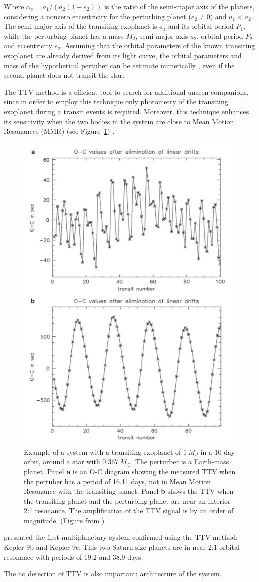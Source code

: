 Where $\alpha_e = a_1/(a_2(1-e_2))$ is the ratio of the semi-major axis of the planets, considering a nonzero eccentricity for the perturbing planet ($e_2 \neq 0$) and $a_1 < a_2$. The semi-major axis of the transiting exoplanet is $a_1$ and its orbital period $P_1$, while the perturbing planet has a mass $M_2$, semi-major axis $a_2$, orbital period $P_2$ and eccentricity $e_2$. Assuming that the orbital parameters of the known transiting exoplanet are already derived from its light curve, the orbital parameters and mass of the hypothetical pertuber can be estimate numerically \citep{Nesvorny2008,Nesvorny2009}, even if the second planet does not transit the star. 

The TTV method is a efficient tool to search for additional unseen companions, since in order to employ this technique only photometry of the transiting exoplanet during a transit events is required. Moreover, this technique enhances its sensitivity when the two bodies in the system are close to Mean Motion Resonances (MMR) \citep{Agol2005,Steffen2005,Agol2007} (see Figure~\ref{rms_ttv_amplitude}) . 

\begin{figure}
\centering
\includegraphics[width=0.6\columnwidth]{imagenes/rms_ttv_amplitude}
\caption{Example of a system with a transiting exoplanet of $1~M_{J}$ in a 10-day orbit, around a star with $0.367~M_{\odot}$. The perturber is a Earth-mass planet. Panel \textbf{a} is an O-C diagram showing the measured TTV when the pertuber has a period of 16.11 days, not in Mean Motion Resonance with the transiting planet. Panel \textbf{b} shows the TTV when the transiting planet and the perturbing planet are near an interior 2:1 resonance. The amplification of the TTV signal is by an order of magnitude. (Figure from \cite{Haghighipour2011})}
\label{rms_ttv_amplitude}
\end{figure}

\cite{Holman2010} presented the first multiplanetary system confirmed using the TTV method: Kepler-9b and Kepler-9c. This two Saturn-size planets are in near 2:1 orbital resonance with periods of 19.2 and 38.9 days.

The no detection of TTV is also important: architecture of the system.


